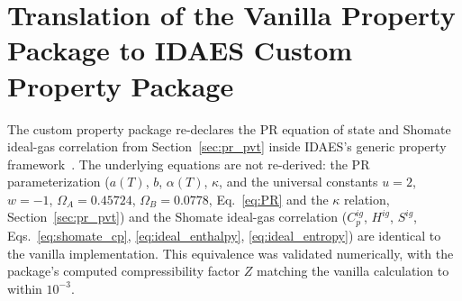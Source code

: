 \documentclass{article}
\begin{document}
\section{Translation of the Vanilla Property Package to IDAES Custom Property Package}\label{sec:idaes_translation}
The custom property package re-declares the PR equation of state and Shomate ideal-gas correlation from Section~\ref{sec:pr_pvt} inside IDAES's generic property framework~\cite{idaes_cubic_eos_2026}. The underlying equations are not re-derived: the PR parameterization ($a(T)$, $b$, $\alpha(T)$, $\kappa$, and the universal constants $u=2$, $w=-1$, $\Omega_A=0.45724$, $\Omega_B=0.0778$, Eq.~\eqref{eq:PR} and the $\kappa$ relation, Section~\ref{sec:pr_pvt}) and the Shomate ideal-gas correlation ($C_p^{ig}$, $H^{ig}$, $S^{ig}$, Eqs.~\eqref{eq:shomate_cp}, \eqref{eq:ideal_enthalpy}, \eqref{eq:ideal_entropy}) are identical to the vanilla implementation. This equivalence was validated numerically, with the package's computed compressibility factor $Z$ matching the vanilla calculation to within $10^{-3}$.
\end{document}

